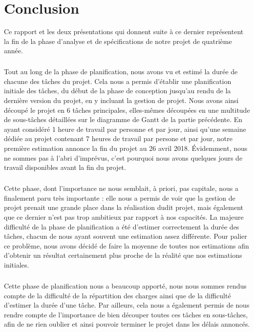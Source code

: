 \chapter{Conclusion}

Ce rapport et les deux présentations qui donnent suite à ce dernier représentent la fin
de la phase d’analyse et de spécifications de notre projet de quatrième année.

\paragraph{}

Tout au long de la phase de planification, nous avons vu et estimé la durée de chacune des tâches du projet. Cela nous a permis d’établir une planification initiale des tâches, du début de la phase de conception jusqu’au rendu de la dernière version du projet, en y incluant la gestion de projet. Nous avons ainsi découpé le projet en 6 tâches principales, elles-mêmes découpées en une multitude de sous-tâches détaillées sur le diagramme de Gantt de la partie précédente. En ayant considéré 1 heure de travail par personne et par jour, ainsi qu’une semaine dédiée   au projet contenant 7 heures de travail par persone et par jour,  notre première estimation annonce la fin du projet au 26 avril 2018. Évidemment, nous ne sommes pas à l’abri d’imprévus, c’est pourquoi nous avons quelques jours de travail disponibles avant la fin du projet.

\paragraph{}

Cette phase, dont l’importance ne nous semblait, à priori, pas capitale, nous a finalement paru très importante : elle nous a permis de voir que la gestion de projet prenait une grande place dans la réalisation dudit projet, mais également que ce dernier n’est pas trop ambitieux par rapport à nos capacités. La majeure difficulté de la phase de planification a été d’estimer correctement la durée des tâches, chacun de nous ayant souvent une estimation assez différente. Pour palier ce problème, nous avons décidé de faire la moyenne de toutes nos estimations afin d’obtenir un résultat certainement plus proche de la réalité que nos estimations initiales.

\paragraph{}

Cette phase de planification nous a beaucoup apporté, nous nous sommes rendus compte de la difficulté de la répartition des charges ainsi que de la difficulté d’estimer la durée d’une tâche. Par ailleurs, cela nous a également permis de nous rendre compte de l’importance de bien découper toutes ces tâches en sous-tâches, afin de ne rien oublier et ainsi pouvoir terminer le projet dans les délais annoncés.
